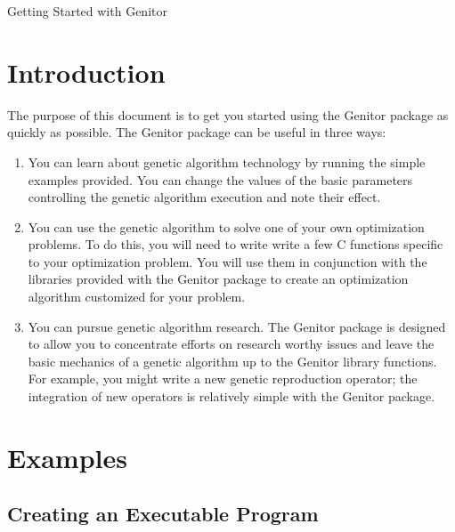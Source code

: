 
\setlength{\textwidth}{7.25in}
\setlength{\textheight}{9.25in}
\setlength{\oddsidemargin}{-.2in}
\setlength{\evensidemargin}{-.2in}
\setlength{\topmargin}{-.5in}



\begin{center}
{\huge Getting Started with Genitor}
\end{center}

\section{Introduction}

The purpose of this document is to get you started using the Genitor package
as quickly as possible.  The Genitor package can be useful in three ways:

\begin{enumerate}
 \item You can learn about genetic algorithm technology by running the
	   simple examples provided.  You can change the values of the 
	   basic parameters controlling the genetic algorithm execution
	   and note their effect.
 \item You can use the genetic algorithm to solve one of your own
	   optimization problems.  To do this, you will need to write 
	   write a few C functions specific to your optimization problem.
	   You will use them in conjunction with the libraries provided with
	   the Genitor package to create an optimization algorithm 
	   customized for your problem. 
 \item You can pursue genetic algorithm research.  The Genitor package
       is designed to allow you to concentrate efforts on research worthy
	   issues and leave the basic mechanics of a genetic algorithm up to
	   the Genitor library functions.  For example, you might write a 
	   new genetic reproduction operator; the integration of new operators
	   is relatively simple with the Genitor package.	
\end{enumerate}

\section{Examples}

\subsection{Creating an Executable Program}

